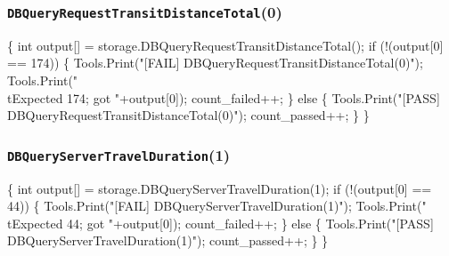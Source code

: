 \documentclass{article}
\def\nwendcode{\endtrivlist \endgroup}
\let\nwdocspar=\par
\begin{document}
\subsubsection{{\tt{}DBQueryRequestTransitDistanceTotal}(0)}
\nwenddocs{}\endmoddef{}
\{
  int output[] = storage.DBQueryRequestTransitDistanceTotal();
  if (!(output[0] == 174)) \{
    Tools.Print("[FAIL] DBQueryRequestTransitDistanceTotal(0)");
    Tools.Print("\\tExpected 174; got "+output[0]);
    count_failed++;
  \} else \{
    Tools.Print("[PASS] DBQueryRequestTransitDistanceTotal(0)");
    count_passed++;
  \}
\}
\nwendcode{}\nwdocspar
\subsubsection{{\tt{}DBQueryServerTravelDuration}(1)}
\nwenddocs{}\endmoddef{}
\{
  int output[] = storage.DBQueryServerTravelDuration(1);
  if (!(output[0] == 44)) \{
    Tools.Print("[FAIL] DBQueryServerTravelDuration(1)");
    Tools.Print("\\tExpected 44; got "+output[0]);
    count_failed++;
  \} else \{
    Tools.Print("[PASS] DBQueryServerTravelDuration(1)");
    count_passed++;
  \}
\}
\nwendcode{}\nwdocspar
\end{document}
